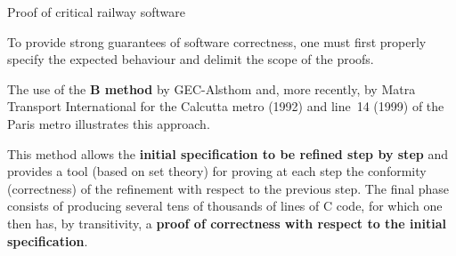 \documentclass[compress,dvipdfmx]{beamer}
\begin{document}
%








%
\begin{frame}{Proof of critical railway software}

  To provide strong guarantees of software correctness, one must first
  properly specify the expected behaviour and delimit the scope of the
  proofs.

  \bigskip

  The use of the \textbf{B method} by GEC-Alsthom and, more recently,
  by Matra Transport International for the Calcutta metro (1992) and
  line~14 (1999) of the Paris metro illustrates this approach.

  \bigskip

  This method allows the \textbf{initial specification to be refined
    step by step} and provides a tool (based on set theory) for
  proving at each step the conformity (correctness) of the refinement
  with respect to the previous step. The final phase consists of
  producing several tens of thousands of lines of \textsf{C} code, for
  which one then has, by transitivity, a \textbf{proof of correctness with
  respect to the initial specification}.

\end{frame}
\end{document}
